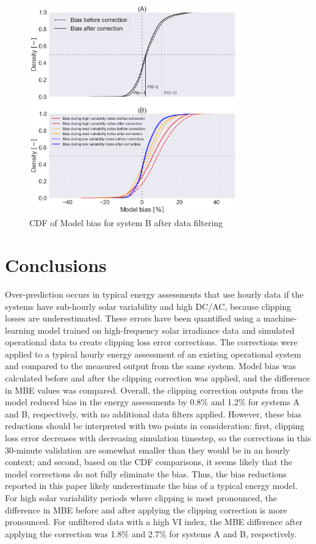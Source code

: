 \documentclass[conference]{IEEEtran}
\begin{document}
\begin{figure}[htbp]
\centerline{\includegraphics[width=9cm]{PAW_ModelBias_breakdown_AFTER_filter_CDF_v4.png}}
\caption{CDF of Model bias for system B after data filtering}
\label{fig:PAW-modelbias-after-filter-cdf}
\end{figure}

\section{Conclusions}
Over-prediction occurs in typical energy assessments that use hourly data if the systems have sub-hourly solar variability and high DC/AC, because clipping losses are underestimated. These errors have been quantified using a machine-learning model trained on high-frequency solar irradiance data and simulated operational data to create clipping loss error corrections. The corrections were applied to a typical hourly energy assessment of an existing operational system and compared to the measured output from the same system. Model bias was calculated before and after the clipping correction was applied, and the difference in MBE values was compared. Overall, the clipping correction outputs from the model reduced bias in the energy assessments by 0.8\% and 1.2\% for systems A and B,  respectively, with no additional data filters applied. However, these bias reductions should be interpreted with two points in consideration:  first, clipping loss error decreases with decreasing simulation timestep, so the corrections in this 30-minute validation are somewhat smaller than they would be in an hourly context; and second, based on the CDF comparisons, it seems likely that the model corrections do not fully eliminate the bias. Thus, the bias reductions reported in this paper likely underestimate the bias of a typical energy model. For high solar variability periods where clipping is most pronounced, the difference in MBE before and after applying the clipping correction is more pronounced. For unfiltered data with a high VI index, the MBE difference after applying the correction was 1.8\% and 2.7\% for systems A and B, respectively. 
\end{document}
